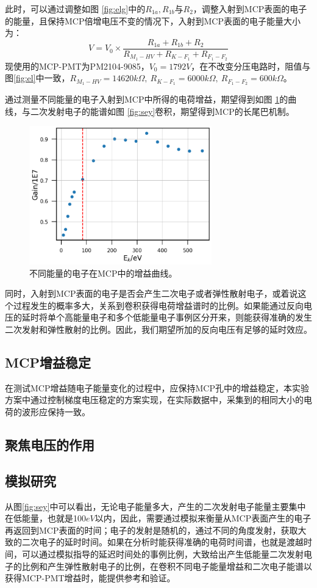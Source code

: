 \documentclass[a4paper]{article}
\begin{document}
此时，可以通过调整如图 \ref{fig:elg}中的$R_{1a},R_{1b}$与$R_2$，调整入射到MCP表面的电子的能量，且保持MCP倍增电压不变的情况下，入射到MCP表面的电子能量大小为：
\begin{equation}
    V = V_0\times \frac{R_{1a}+R_{1b}+R_2}{R_{M_1-HV}+R_{K-F_1}+R_{F_1-F_2}}
\end{equation}
现使用的MCP-PMT为PM2104-9085，$V_0=1792V$，在不改变分压电路时，阻值与图\ref{fig:el}中一致，$R_{M_1-HV}=14620k\Omega,\ R_{K-F_1}=6000k\Omega,\ R_{F_1-F_2}=600k\Omega$。

通过测量不同能量的电子入射到MCP中所得的电荷增益，期望得到如图 \ref{fig:gain}的曲线，与二次发射电子的能谱如图 \ref{fig:sey}卷积，期望得到MCP的长尾巴机制。
\begin{figure}[ht]
    \centering
    \includegraphics[height=6cm]{images/gain.png}
    \caption{不同能量的电子在MCP中的增益曲线。}
    \label{fig:gain}
\end{figure}

同时，入射到MCP表面的电子是否会产生二次电子或者弹性散射电子，或着说这个过程发生的概率多大，关系到卷积获得电荷增益谱时的比例。如果能通过反向电压的延时将单个高能量电子和多个低能量电子事例区分开来，则能获得准确的发生二次发射和弹性散射的比例。因此，我们期望所加的反向电压有足够的延时效应。

\subsection{MCP增益稳定}
在测试MCP增益随电子能量变化的过程中，应保持MCP孔中的增益稳定，本实验方案中通过控制梯度电压稳定的方案实现，在实际数据中，采集到的相同大小的电荷的波形应保持一致。
\subsection{聚焦电压的作用}
\subsection{模拟研究}
从图\ref{fig:sey}中可以看出，无论电子能量多大，产生的二次发射电子能量主要集中在低能量，也就是100$eV$以内，因此，需要通过模拟来衡量从MCP表面产生的电子再返回到MCP表面的时间；电子的发射是随机的，通过不同的角度发射，获取大致的二次电子的延时时间。如果在分析时能获得准确的电荷时间谱，也就是渡越时间，可以通过模拟指导的延迟时间处的事例比例，大致给出产生低能量二次发射电子的比例和产生弹性散射电子的比例，在卷积不同电子能量增益和二次电子能谱以获得MCP-PMT增益时，能提供参考和验证。
\end{document}
